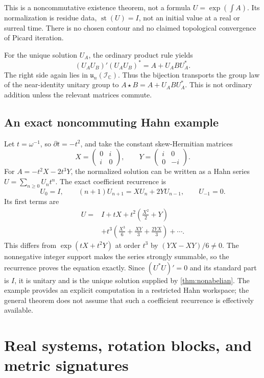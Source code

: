 \documentclass[11pt,a4paper]{article}
\numberwithin{equation}{section}
\theoremstyle{definition}
\theoremstyle{remark}
\newcommand{\C}{\mathbb C}
\newcommand{\II}{\mathcal I}
\newcommand{\st}{\operatorname{st}}
\begin{document}
This is a noncommutative existence theorem, not a formula
$U=\exp(\int A)$. Its normalization is residue data, $\st(U)=I$, not an
initial value at a real or surreal time. There is no chosen contour and
no claimed topological convergence of Picard iteration.

For the unique solution $U_A$, the ordinary product rule yields
\begin{equation}\label{eq:cocycle}
 (U_AU_B)'(U_AU_B)^*
    =A+U_ABU_A^*.
\end{equation}
The right side again lies in $\mathfrak u_n(\II_{\C})$. Thus the bijection
transports the group law of the near-identity unitary group to
$A\star B=A+U_ABU_A^*$. This is not ordinary addition unless the relevant
matrices commute.

\subsection{An exact noncommuting Hahn example}
Let $t=\omega^{-1}$, so $\partial t=-t^2$, and take the constant
skew-Hermitian matrices
\[
 X=\begin{pmatrix}0&i\\i&0\end{pmatrix},\qquad
 Y=\begin{pmatrix}i&0\\0&-i\end{pmatrix}.
\]
For $A=-t^2X-2t^3Y$, the normalized solution can be written as a Hahn series
$U=\sum_{n\ge0}U_nt^n$. The exact coefficient recurrence is
\begin{equation}\label{eq:noncommrec}
 U_0=I,\qquad
 (n+1)U_{n+1}=XU_n+2YU_{n-1},\qquad U_{-1}=0.
\end{equation}
Its first terms are
\begin{align*}
 U={}&I+tX+t^2\left(\frac{X^2}{2}+Y\right)\\
 &+t^3\left(\frac{X^3}{6}+\frac{XY}{3}+\frac{2YX}{3}\right)+\cdots.
\end{align*}
This differs from $\exp(tX+t^2Y)$ at order $t^3$ by
$(YX-XY)/6\ne0$. The nonnegative integer support makes the series strongly
summable, so the recurrence proves the equation exactly. Since
$(U^*U)'=0$ and its standard part is $I$, it is unitary and is the unique
solution supplied by \cref{thm:nonabelian}. The example provides an explicit
computation in a restricted Hahn workspace; the general theorem does not
assume that such a coefficient recurrence is effectively available.

\section{Real systems, rotation blocks, and metric signatures}\label{sec:real}
\end{document}
